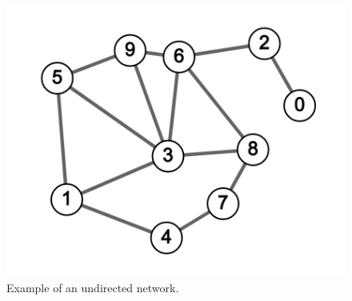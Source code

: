\begin{figure}[H]
  \centering
    \includegraphics[scale=.25]{img/undirected_sample.png}
    \caption{Example of an undirected network.}
    \label{fig:net_un}
\end{figure}

